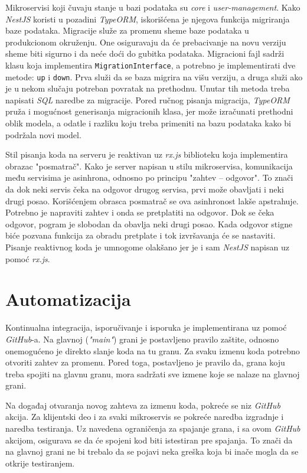 Mikroservisi koji čuvaju stanje u bazi podataka su \textit{core} i 
\textit{user-management}. Kako \textit{NestJS} koristi u pozadini \textit{TypeORM}, 
iskorišćena je njegova funkcija migriranja baze podataka. Migracije služe 
za promenu sheme baze podataka u produkcionom okruženju. One osiguravaju da 
će prebacivanje na novu verziju sheme biti sigurno i da neće doći do gubitka 
podataka. Migracioni fajl sadrži klasu koja implementira 
\texttt{MigrationInterface}, a potrebno je implementirati dve metode: 
\texttt{up} i \texttt{down}. Prva služi da se baza migrira na višu 
verziju, a druga služi ako je u nekom slučaju potreban povratak na prethodnu. 
Unutar tih metoda treba napisati \textit{SQL} naredbe za migracije. Pored 
ručnog pisanja migracija, \textit{TypeORM} pruža i mogućnost generisanja 
migracionih klasa, jer može izračunati prethodni oblik modela, a odatle i 
razliku koju treba primeniti na bazu podataka kako bi podržala novi model. 

Stil pisanja koda na serveru je reaktivan uz \textit{rx.js} biblioteku koja
implementira obrazac "posmatrač". Kako je server napisan u stilu mikroservisa,
komunikacija među servisima je asinhrona, odnosno po principu 
"zahtev -- odgovor". To znači da dok neki servis čeka na odgovor drugog 
servisa, prvi može obavljati i neki drugi posao. Korišćenjem obrasca 
posmatrač se ova asinhronost lakše apstrahuje. Potrebno je napraviti zahtev 
i onda se pretplatiti na odgovor. Dok se čeka odgovor, pogram je slobodan da 
obavlja neki drugi posao. Kada odgovor stigne biće pozvana funkcija 
za obradu pretplate i tok izvršavanja će se nastaviti.
Pisanje reaktivnog koda je umnogome olakšano jer je i sam \textit{NestJS} 
napisan uz pomoć \textit{rx.js}. 

\section{Automatizacija}
Kontinualna integracija, isporučivanje i isporuka je implementirana uz 
pomoć \textit{GitHub}-a. Na glavnoj (\textit{"main"}) grani 
je postavljeno pravilo zaštite, odnosno onemogućeno je direkto slanje 
koda na tu granu. Za svaku izmenu koda potrebno otvoriti zahtev za 
promenu. Pored toga, postavljeno je pravilo da, grana koju treba spojiti 
na glavnu granu, mora sadržati sve izmene koje se nalaze na glavnoj grani.

Na događaj otvaranja novog zahteva za izmenu koda, pokreće se niz 
\textit{GitHub} akcija. Za klijentski deo i za svaki mikroservis 
se pokreće naredba izgradnje i naredba testiranja. Uz navedena 
ograničenja za spajanje grana, i sa ovom \textit{GitHub} akcijom, 
osigurava se da će spojeni kod biti istestiran pre spajanja. To znači da 
na glavnoj grani ne bi trebalo da se pojavi neka greška koja bi inače mogla 
da se otkrije testiranjem.

